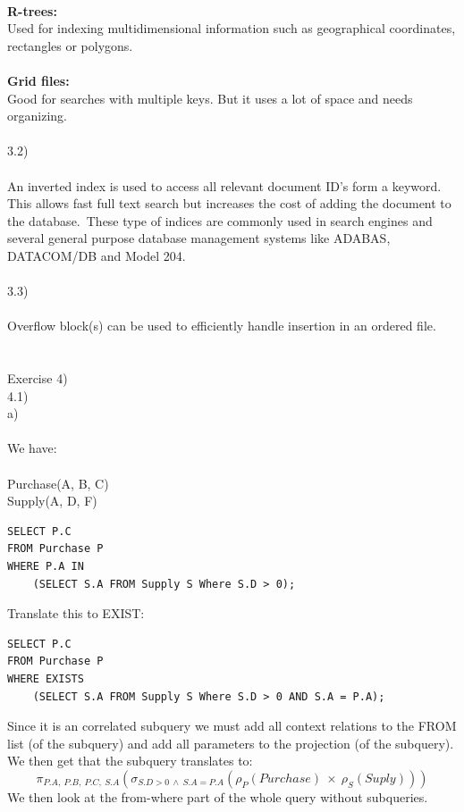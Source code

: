 \documentclass[12pt, letterpaper, twoside]{article}
\begin{document}
\\
\textbf{R-trees:}\\
Used for indexing multidimensional information such as geographical coordinates, rectangles or polygons.\\
\\
\textbf{Grid files:}\\
Good for searches with multiple keys. But it uses a lot of space and needs organizing.\\
\\
3.2)\\
\\
An inverted index is used to access all relevant document ID's form a keyword. This allows fast full text search but increases the cost of adding the document to the database.\ These type of indices are commonly used in search engines and several general purpose database management systems like ADABAS, DATACOM/DB and Model 204.\\
\\
3.3)\\
\\
Overflow block(s) can be used to efficiently handle insertion in an ordered file.\\
\\
\newpage
\ \\
Exercise 4)\\
4.1)\\
a)\\
\\
We have:\\
\\
Purchase(A, B, C)\\
Supply(A, D, F)\\
\begin{verbatim}
SELECT P.C
FROM Purchase P
WHERE P.A IN
    (SELECT S.A FROM Supply S Where S.D > 0);
\end{verbatim}
Translate this to EXIST:
\begin{verbatim}
SELECT P.C
FROM Purchase P
WHERE EXISTS
    (SELECT S.A FROM Supply S Where S.D > 0 AND S.A = P.A);
\end{verbatim}
Since it is an correlated subquery we must add all context relations to the FROM list (of the subquery) and add all parameters to the projection (of the subquery).\\
We then get that the subquery translates to:\\
$$
\pi_{P.A,\ P.B,\ P.C,\ S.A}(\sigma_{S.D > 0\ \wedge\ S.A = P.A}(\rho_P(Purchase)\ \times\ \rho_S(Suply)))
$$   
We then look at the from-where part of the whole query without subqueries.
\end{document}
